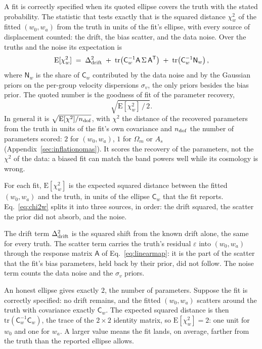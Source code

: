 \documentclass[11pt]{article}
\newcommand{\Cov}{\mathsf{C}}
\newcommand{\T}{^{\mathsf{T}}}
\begin{document}
A fit is correctly specified when its quoted ellipse covers the
truth with the stated probability.  The statistic that tests exactly
that is the squared distance $\chi^2_w$ of the fitted $(w_0, w_a)$
from the truth in units of the fit's ellipse, with every source of
displacement counted: the drift, the bias scatter, and the data
noise.  Over the truths and the noise its expectation is
\begin{equation}
  \mathrm{E}[\chi^2_w]
  \;=\;
  \Delta_{\rm drift}^2
  \;+\;
  \mathrm{tr}\!\left(\Cov_w^{-1} \mathsf{A}\,\Sigma\,\mathsf{A}\T\right)
  \;+\;
  \mathrm{tr}\!\left(\Cov_w^{-1} \mathsf{N}_w\right),
  \label{eq:chi2w}
\end{equation}
where $\mathsf{N}_w$ is the share of $\Cov_w$ contributed by the
data noise and by the Gaussian priors on the per-group velocity
dispersions $\sigma_v$, the only priors besides the bias prior.  The
quoted number is the goodness of fit of the parameter recovery,
\begin{equation}
  \sqrt{\mathrm{E}[\chi^2_w]\,/\,2} .
  \label{eq:inflation}
\end{equation}
In general it is $\sqrt{\mathrm{E}[\chi^2]/n_{\rm dof}}$, with
$\chi^2$ the distance of the recovered parameters from the truth in
units of the fit's own covariance and $n_{\rm dof}$ the number of
parameters scored: $2$ for $(w_0, w_a)$, $1$ for $\Omega_m$ or $A_s$
(Appendix~\ref{sec:inflationomas}).  It scores the recovery of the
parameters, not the $\chi^2$ of the data: a biased fit can match the
band powers well while its cosmology is wrong.

For each fit, $\mathrm{E}[\chi^2_w]$ is the expected squared
distance between the fitted $(w_0, w_a)$ and the truth, in units of
the ellipse $\Cov_w$ that the fit reports.  Eq.~\eqref{eq:chi2w}
splits it into three sources, in order: the drift squared, the
scatter the prior did not absorb, and the noise.

The drift term $\Delta_{\rm drift}^2$ is the squared shift from the
known drift alone, the same for every truth.  The scatter term
carries the truth's residual $\varepsilon$ into $(w_0, w_a)$ through
the response matrix $\mathsf{A}$ of Eq.~\eqref{eq:linearmap}: it is
the part of the scatter that the fit's bias parameters, held back by
their prior, did not follow.  The noise term counts the data noise
and the $\sigma_v$ priors.

An honest ellipse gives exactly $2$, the number of parameters.
Suppose the fit is correctly specified: no drift remains, and the
fitted $(w_0, w_a)$ scatters around the truth with covariance exactly
$\Cov_w$.  The expected squared distance is then
$\mathrm{tr}(\Cov_w^{-1}\Cov_w)$, the trace of the $2 \times 2$
identity matrix, so $\mathrm{E}[\chi^2_w] = 2$: one unit for $w_0$
and one for $w_a$.  A larger value means the fit lands, on average,
farther from the truth than the reported ellipse allows.
\end{document}
